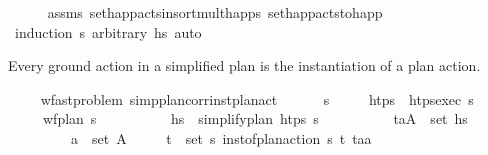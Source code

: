 \begin{isabellebody}
%
\isadelimproof
\ \ \ \ %
\endisadelimproof
%
\isatagproof
{}\isamarkupfalse%
\ assms\ set{\isacharunderscore}{\kern0pt}happ{\isacharunderscore}{\kern0pt}acts{\isacharunderscore}{\kern0pt}insort{\isacharunderscore}{\kern0pt}mult{\isacharunderscore}{\kern0pt}happs\ set{\isacharunderscore}{\kern0pt}happ{\isacharunderscore}{\kern0pt}acts{\isacharunderscore}{\kern0pt}to{\isacharunderscore}{\kern0pt}happ\isanewline
\ \ \ \ \isamarkupfalse%
\ {\isacharparenleft}{\kern0pt}induction\ {\isasympi}s\ arbitrary{\isacharcolon}{\kern0pt}\ hs{\isacharparenright}{\kern0pt}\ auto%
\endisatagproof
{\isafoldproof}%
%
\isadelimproof
%
\endisadelimproof
%
\begin{isamarkuptext}%
Every ground action in a simplified plan is the instantiation of a plan action.%
\end{isamarkuptext}\isamarkuptrue%
\ \ \isamarkupfalse%
\ {\isacharparenleft}{\kern0pt}\ wf{\isacharunderscore}{\kern0pt}ast{\isacharunderscore}{\kern0pt}problem{\isacharparenright}{\kern0pt}\ simp{\isacharunderscore}{\kern0pt}plan{\isacharunderscore}{\kern0pt}corr{\isacharunderscore}{\kern0pt}inst{\isacharunderscore}{\kern0pt}plan{\isacharunderscore}{\kern0pt}act{\isacharcolon}{\kern0pt}\ \isanewline
\ \ \ \ \ {\isasympi}s\isanewline
\ \ \ \ \ {\isachardoublequoteopen}htps\ {\isasymequiv}\ htps{\isacharunderscore}{\kern0pt}exec\ {\isasympi}s{\isachardoublequoteclose}\isanewline
\ \ \ \ \ {\isachardoublequoteopen}wf{\isacharunderscore}{\kern0pt}plan\ {\isasympi}s{\isachardoublequoteclose}\ \isanewline
\ \ \ \ \ \ \ \ \ {\isachardoublequoteopen}hs\ {\isacharequal}{\kern0pt}\ simplify{\isacharunderscore}{\kern0pt}plan\ htps\ {\isasympi}s{\isachardoublequoteclose}\ \isanewline
\ \ \ \ \ \ \ \ \ {\isachardoublequoteopen}{\isacharparenleft}{\kern0pt}t\isactrlsub a{\isacharcomma}{\kern0pt}A{\isacharparenright}{\kern0pt}\ {\isasymin}\ set\ hs{\isachardoublequoteclose}\ \isanewline
\ \ \ \ \ \ \ \ \ {\isachardoublequoteopen}a\ {\isasymin}\ set\ A{\isachardoublequoteclose}\isanewline
\ \ \ \ \ {\isachardoublequoteopen}{\isasymexists}{\isacharparenleft}{\kern0pt}t\isactrlsub {\isasympi}{\isacharcomma}{\kern0pt}{\isasympi}{\isacharparenright}{\kern0pt}\ {\isasymin}\ set\ {\isasympi}s{\isachardot}{\kern0pt}\ inst{\isacharunderscore}{\kern0pt}of{\isacharunderscore}{\kern0pt}plan{\isacharunderscore}{\kern0pt}action\ {\isasympi}s\ {\isacharparenleft}{\kern0pt}t\isactrlsub {\isasympi}{\isacharcomma}{\kern0pt}{\isasympi}{\isacharparenright}{\kern0pt}\ {\isacharparenleft}{\kern0pt}t\isactrlsub a{\isacharcomma}{\kern0pt}a{\isacharparenright}{\kern0pt}{\isachardoublequoteclose}\isanewline

\end{isabellebody}
